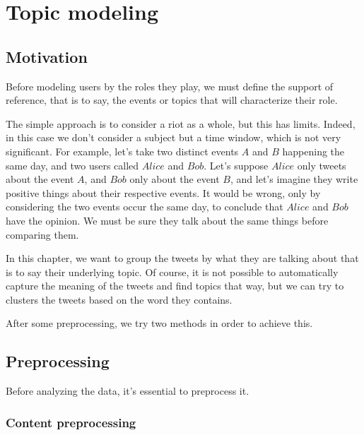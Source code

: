 \documentclass[a4paper,twoside,12pt,openright]{report}
\begin{document}
\chapter{Topic modeling}

\section{Motivation}

Before modeling users by the roles they play, we must define the support of reference, that is to say, the events or topics that will characterize their role.

The simple approach is to consider a riot as a whole, but this has limits. Indeed, in this case we don't consider a subject but a time window, which is not very significant. For example, let's take two distinct events $A$ and $B$ happening the same day, and two users called $Alice$ and $Bob$. Let's suppose $Alice$ only tweets about the event $A$, and $Bob$ only about the event $B$, and let's imagine they write positive things about their respective events. It would be wrong, only by considering the two events occur the same day, to conclude that $Alice$ and $Bob$ have the opinion. We must be sure they talk about the same things before comparing them.

In this chapter, we want to group the tweets by what they are talking about that is to say their underlying topic. Of course, it is not possible to automatically capture the meaning of the tweets and find topics that way, but we can try to clusters the tweets based on the word they contains.

After some preprocessing, we try two methods in order to achieve this.


\newpage

\section{Preprocessing}

Before analyzing the data, it's essential to preprocess it. 

\subsection{Content preprocessing}

\end{document}
